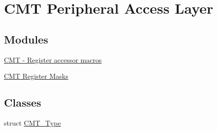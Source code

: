 \hypertarget{group__CMT__Peripheral__Access__Layer}{}\section{C\+MT Peripheral Access Layer}
\label{group__CMT__Peripheral__Access__Layer}
\subsection*{Modules}
\begin{DoxyCompactItemize}
\item 
\hyperlink{group__CMT__Register__Accessor__Macros}{C\+M\+T -\/ Register accessor macros}
\item 
\hyperlink{group__CMT__Register__Masks}{C\+M\+T Register Masks}
\end{DoxyCompactItemize}
\subsection*{Classes}
\begin{DoxyCompactItemize}
\item 
struct \hyperlink{structCMT__Type}{C\+M\+T\+\_\+\+Type}
\end{DoxyCompactItemize}
